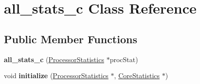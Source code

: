 \hypertarget{classall__stats__c}{
\section{all\_\-stats\_\-c Class Reference}
\label{classall__stats__c}
}
\subsection*{Public Member Functions}
\begin{DoxyCompactItemize}
\item 
\hypertarget{classall__stats__c_a40943439d8bea8d74f71dc289100cb3e}{
{\bfseries all\_\-stats\_\-c} (\hyperlink{classProcessorStatistics}{ProcessorStatistics} $\ast$procStat)}
\label{classall__stats__c_a40943439d8bea8d74f71dc289100cb3e}

\item 
\hypertarget{classall__stats__c_af4ba0fc973f9cf8d038d01dc6c37f9bd}{
void {\bfseries initialize} (\hyperlink{classProcessorStatistics}{ProcessorStatistics} $\ast$, \hyperlink{classCoreStatistics}{CoreStatistics} $\ast$)}
\label{classall__stats__c_af4ba0fc973f9cf8d038d01dc6c37f9bd}

\end{DoxyCompactItemize}
